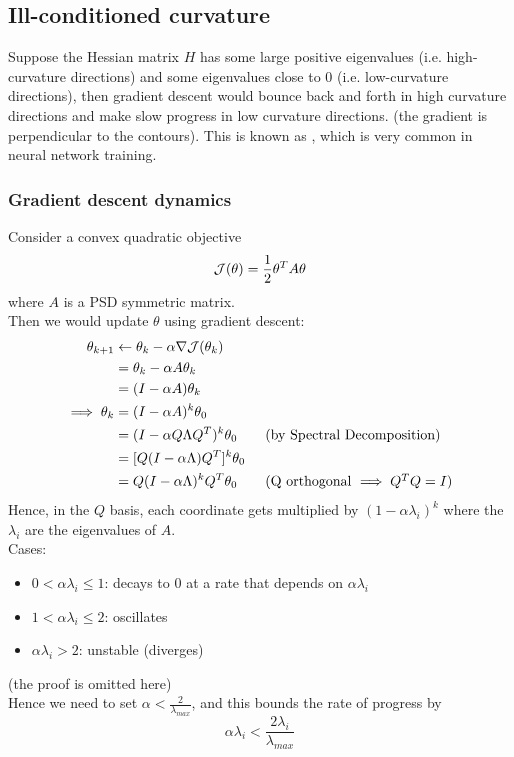 \documentclass[11pt]{article}
\begin{document}
\subsection{Ill-conditioned curvature}
    Suppose the Hessian matrix $H$ has some large positive eigenvalues (i.e. high-curvature directions) and some eigenvalues close to 0 (i.e. low-curvature directions), then gradient descent would bounce back and forth in high curvature directions and make slow progress in low curvature directions. (the gradient is perpendicular to the contours). This is known as , which is very common in neural network training.
    \subsubsection{Gradient descent dynamics}
    Consider a convex quadratic objective
    $$\mathcal{J}(\theta) = \frac{1}{2}\theta^TA\theta$$
    where $A$ is a PSD symmetric matrix.\\
    Then we would update $\theta$ using gradient descent:
    \begin{align*}
    	\theta_{k+1} &\leftarrow \theta_k - \alpha \nabla \mathcal{J}(\theta_k)\\
    	&= \theta_k - \alpha A \theta_k \\
    	&= (I - \alpha A) \theta_k\\
    	\implies \theta_k &= (I - \alpha A)^k \theta_0\\
    	&= (I-\alpha Q\Lambda Q^T)^k \theta_0 \tag{by Spectral Decomposition}\\
    	&= [Q(I - \alpha \Lambda) Q^T]^k \theta_0\\
    	&= Q(I - \alpha \Lambda)^k Q^T \theta_0 \tag{Q orthogonal $\implies Q^TQ = I$}
    \end{align*}
    Hence, in the $Q$ basis, each coordinate gets multiplied by $(1 - \alpha \lambda_i)^k$ where the $\lambda_i$ are the eigenvalues of $A$.\\
    Cases:
    \begin{itemize}
    	\item $0 < \alpha \lambda_i \leq 1$: decays to 0 at a rate that depends on $\alpha \lambda_i$
    	\item $1 < \alpha \lambda_i \leq 2$: oscillates
    	\item $\alpha \lambda_i > 2$: unstable (diverges)
    \end{itemize}
    (the proof is omitted here)\\
    Hence we need to set $\alpha < \frac{2}{\lambda_{max}}$, and this bounds the rate of progress by
    $$\alpha \lambda_i < \frac{2\lambda_i}{\lambda_{max}}$$
\end{document}
